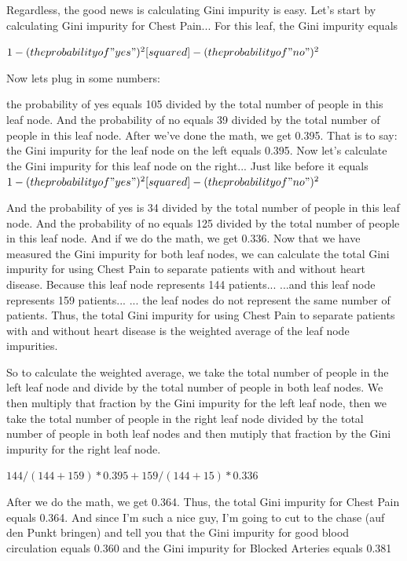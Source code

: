 \documentclass[
	final,
	a4paper,
	oneside,
	parskip=full,
	headings=standardclasses,
	headings=big,
	pointednumbers
]{scrartcl}
\begin{document}
        Regardless, the good news is calculating Gini impurity is easy.
        Let's start by calculating Gini impurity for Chest Pain...
        For this leaf, the Gini impurity equals

        $1 - (the probability of "yes")^2 [squared] - (the probability of "no")^2$

        Now lets plug in some numbers:
        
        the probability of yes equals 105 divided by the total number of people
        in this leaf node. And the probability of no equals 39 divided by the total
        number of people in this leaf node. After we've done the math, we get 0.395.
        That is to say: the Gini impurity for the leaf node on the left equals 0.395.
        Now let's calculate the Gini impurity for this leaf node on the right...
        Just like before it equals
        $1 - (the probability of "yes")^2 [squared] - (the probability of "no")^2$

        And the probability of yes is 34 divided by the total number of people in
        this leaf node. And the probability of no equals 125 divided 
        by the total number of people in this leaf node.
        And if we do the math, we get 0.336.
        Now that we have measured the Gini impurity for both leaf nodes,
        we can calculate the total Gini impurity for using Chest Pain
        to separate patients with and without heart disease.
        Because this leaf node represents 144 patients...
        ...and this leaf node represents 159 patients...
        ... the leaf nodes do not represent the same number of patients.
        Thus, the total Gini impurity for using Chest Pain to separate patients
        with and without heart disease is the weighted average of the leaf
        node impurities.
        
        So to calculate the weighted average, we take the total number of
        people in the left leaf node and divide by the total number of people
        in both leaf nodes. We then multiply that fraction by the Gini impurity
        for the left leaf node, then we take the total number of people in the
        right leaf node divided by the total number of people in both leaf nodes
        and then mutiply that fraction by the Gini impurity for the right leaf
        node.

        $144 / (144+159) * 0.395 + 159 / (144+15) * 0.336$

        After we do the math, we get 0.364. Thus, the total
        Gini impurity for Chest Pain equals 0.364. And since I'm
        such a nice guy, I'm going to cut to the chase (auf den Punkt bringen)
        and tell you that the Gini impurity for good blood circulation equals 
        0.360 and the Gini impurity for Blocked Arteries equals 0.381
        
\end{document}

